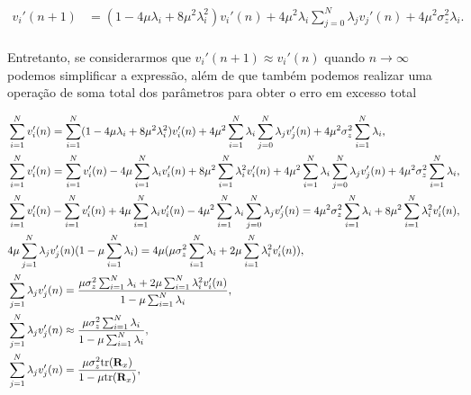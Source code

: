\documentclass[a4paper,10pt]{article}
\begin{document}
\begin{enumerate}
\begin{enumerate}
						\begin{align}
							v_{i}'(n + 1) &= (1 - 4 \mu \lambda_{i} + 8 \mu^{2} \lambda^{2}_{i}) v_{i}'(n) + 4 \mu^{2} \lambda_{i} \sum^{N}_{j = 0} \lambda_{j} v_{j}'(n) + 4 \mu^{2} \sigma^{2}_{z} \lambda_{i}.
						\end{align}

						\paragraph{}Entretanto, se considerarmos que $v_{i}'(n + 1) \approx v_{i}'(n)$ quando $n \rightarrow \infty$ podemos simplificar a expressão, além de que 
						também podemos realizar uma operação de soma total dos parâmetros para obter o erro em excesso total

						\begin{align}
							\notag &\sum^{N}_{i = 1} v_{i}'(n) = \sum^{N}_{i = 1} (1 - 4 \mu \lambda_{i} + 8 \mu^{2} \lambda^{2}_{i}) v_{i}'(n) + 4 \mu^{2} \sum^{N}_{i = 1} \lambda_{i} \sum^{N}_{j = 0} \lambda_{j} v_{j}'(n) + 4 \mu^{2} \sigma^{2}_{z} \sum^{N}_{i = 1} \lambda_{i}, \\
							\notag &\sum^{N}_{i = 1} v_{i}'(n) = \sum^{N}_{i = 1} v_{i}'(n) - 4 \mu \sum^{N}_{i = 1} \lambda_{i} v_{i}'(n)  + 8 \mu^{2} \sum^{N}_{i = 1} \lambda^{2}_{i} v_{i}'(n) + 4 \mu^{2} \sum^{N}_{i = 1} \lambda_{i} \sum^{N}_{j = 0} \lambda_{j} v_{j}'(n) + 4 \mu^{2} \sigma^{2}_{z} \sum^{N}_{i = 1} \lambda_{i}, \\
							\notag &\sum^{N}_{i = 1} v_{i}'(n) - \sum^{N}_{i = 1} v_{i}'(n) + 4 \mu \sum^{N}_{i = 1} \lambda_{i} v_{i}'(n) - 4 \mu^{2} \sum^{N}_{i = 1} \lambda_{i} \sum^{N}_{j = 0} \lambda_{j} v_{j}'(n) = 4 \mu^{2} \sigma^{2}_{z} \sum^{N}_{i = 1} \lambda_{i} + 8 \mu^{2} \sum^{N}_{i = 1} \lambda^{2}_{i} v_{i}'(n), \\
							\notag &4 \mu \sum^{N}_{j = 1} \lambda_{j} v_{j}'(n)(1 - \mu \sum^{N}_{i = 1} \lambda_{i}) = 4 \mu (\mu \sigma^{2}_{z} \sum^{N}_{i = 1} \lambda_{i} + 2 \mu \sum^{N}_{i = 1} \lambda^{2}_{i} v_{i}'(n)), \\
							\notag &\sum^{N}_{j = 1} \lambda_{j} v_{j}'(n) = \frac{\mu \sigma^{2}_{z} \sum^{N}_{i = 1} \lambda_{i} + 2 \mu \sum^{N}_{i = 1} \lambda^{2}_{i} v_{i}'(n)}{1 - \mu \sum^{N}_{i = 1} \lambda_{i}}, \\
							\notag &\sum^{N}_{j = 1} \lambda_{j} v_{j}'(n) \approx \frac{\mu \sigma^{2}_{z} \sum^{N}_{i = 1} \lambda_{i} }{1 - \mu \sum^{N}_{i = 1} \lambda_{i}}, \\
							&\sum^{N}_{j = 1} \lambda_{j} v_{j}'(n) = \frac{\mu \sigma^{2}_{z} \text{tr}(\mathbf{R}_{x})}{1 - \mu \text{tr}(\mathbf{R}_{x})},
						\end{align}


\end{enumerate}
\end{enumerate}
\end{document}
